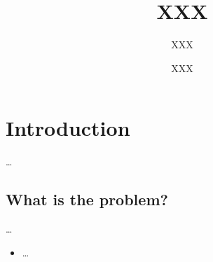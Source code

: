 \title{%
  XXX
}
\subtitle{%
  XXX
}
\author[XXX <XXX@XXX.XXX>]{XXX}

\begin{frame}
  \maketitle
\end{frame}

\mode*

\begin{abstract}
  
\end{abstract}


\section{Introduction}

\dots

\subsection{What is the problem?}

\dots

\begin{frame}
  \begin{itemize}
    \item \dots
  \end{itemize}
\end{frame}



\begin{frame}[allowframebreaks]
  \printbibliography{}
\end{frame}
